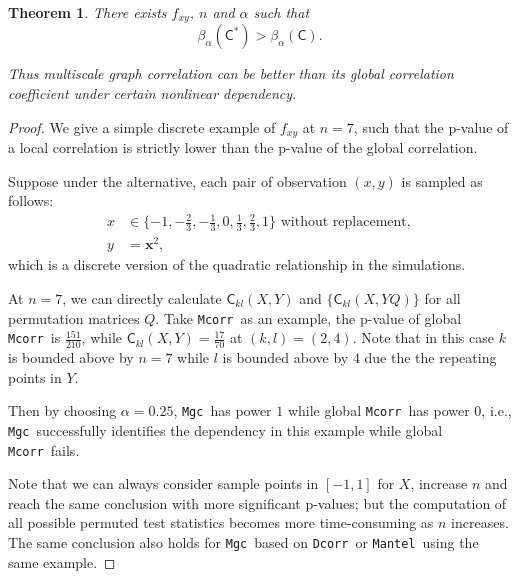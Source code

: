 \documentclass[11pt]{article}
\providecommand{\sct}[1]{{\sc \texttt{#1}}}
\providecommand{\mb}[1]{\boldsymbol{#1}}
\newcommand{\G}{\mathsf{C}}
\newcommand{\Mgc}{\sct{Mgc}}
\newcommand{\Dcorr}{\sct{Dcorr}}
\newcommand{\Mcorr}{\sct{Mcorr}}
\newcommand{\Mantel}{\sct{Mantel}}
\newtheorem{appThm}{Theorem}
\begin{document}
\begin{appThm}
There exists $f_{xy}$, $n$ and $\alpha$ such that 
\begin{equation}
\beta_{\alpha}(\G^{*}) > \beta_{\alpha}(\G).
\end{equation}

Thus multiscale graph correlation can be better than its global correlation coefficient under certain nonlinear dependency.
\end{appThm}
\begin{proof}
We give a simple discrete example of $f_{xy}$ at $n=7$, such that the p-value of a local correlation is strictly lower than the p-value of the global correlation. %

Suppose under the alternative, each pair of observation $(x,y)$ is sampled as follows:
\begin{align*} 
x &\in \{-1,-\frac{2}{3},-\frac{1}{3},0,\frac{1}{3},\frac{2}{3},1\} \mbox{ without replacement}, \\
y &= \mb{x}^2,
\end{align*}
which is a discrete version of the quadratic relationship in the simulations.

At $n=7$, we can directly calculate $\G_{kl}(X, Y)$ and $\{\G_{kl}(X, YQ)\}$ for all permutation matrices $Q$. Take \Mcorr~as an example, the p-value of global \Mcorr~is $\frac{151}{210}$, while $\G_{kl}(X, Y)=\frac{17}{70}$ at $(k,l)=(2,4)$. Note that in this case $k$ is bounded above by $n=7$ while $l$ is bounded above by $4$ due the the repeating points in $Y$. 

Then by choosing $\alpha=0.25$, \Mgc~has power $1$ while global \Mcorr~has power $0$, i.e., \Mgc~successfully identifies the dependency in this example while global \Mcorr~fails. 

Note that we can always consider sample points in $[-1,1]$ for $X$, increase $n$ and reach the same conclusion with more significant p-values; but the computation of all possible permuted test statistics becomes more time-consuming as $n$ increases. The same conclusion also holds for \Mgc~based on \Dcorr~or \Mantel~using the same example.
\end{proof}



\end{document}

